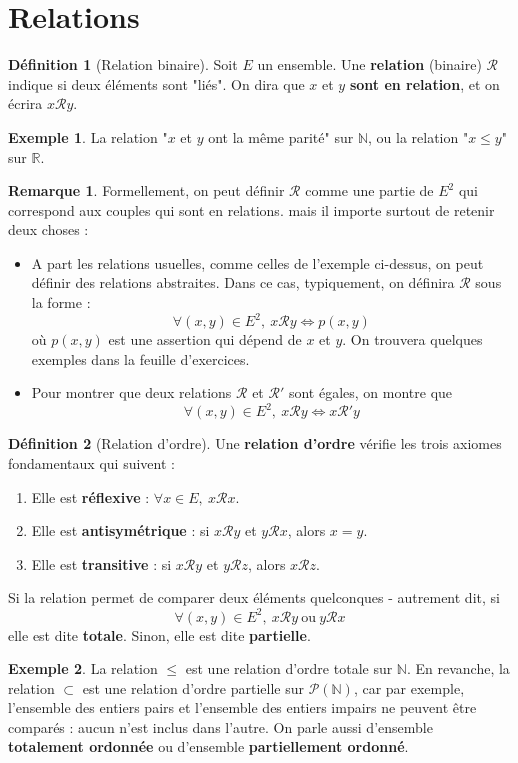 \documentclass[french]{book}
\newcommand{\N}{\mathbb{N}}
\newcommand{\R}{\mathbb{R}}
\theoremstyle{plain}
\theoremstyle{definition}
\newtheorem{dfn}{Définition}[chapter]
\newtheorem{exa}{Exemple}[chapter]
\newtheorem{rmq}{Remarque}[chapter]
\theoremstyle{remark}
\begin{document}
\section{Relations}
\begin{dfn}[Relation binaire]
	Soit $E$ un ensemble. Une \textbf{relation} (binaire) $\mathcal{R}$ indique si deux éléments sont "liés". On dira que $x$ et $y$ \textbf{sont en relation}, et on écrira $x\mathcal{R}y$.
\end{dfn}
\begin{exa}
	La relation "$x$ et $y$ ont la même parité" sur $\N$, ou la relation "$x\leqslant y$" sur $\R$.
\end{exa}
\begin{rmq}
	Formellement, on peut définir $\mathcal{R}$ comme une partie de $E^2$ qui correspond aux couples qui sont en relations. mais il importe surtout de retenir deux choses :
	\begin{itemize}
		\item A part les relations usuelles, comme celles de l'exemple ci-dessus, on peut définir des relations abstraites. Dans ce cas, typiquement, on définira $\mathcal{R}$ sous la forme :$$\forall(x,y)\in E^2,\ x\mathcal{R}y \iff p(x,y)$$ où $p(x,y)$ est une assertion qui dépend de $x$ et $y$. On trouvera quelques exemples dans la feuille d'exercices.
		\item Pour montrer que deux relations $\mathcal{R}$ et $\mathcal{R}'$ sont égales, on montre que $$\forall(x,y)\in E^2,\ x\mathcal{R}y \iff x\mathcal{R}'y$$ 
	\end{itemize}
\end{rmq}
\begin{dfn}[Relation d'ordre]
	Une \textbf{relation d'ordre} vérifie les trois axiomes fondamentaux qui suivent :
	\begin{enumerate}
		\item Elle est \textbf{réflexive} : $\forall x\in E,\ x\mathcal{R}x$.
		\item Elle est \textbf{antisymétrique} : si $x\mathcal{R}y$ et $y\mathcal{R}x$, alors $x=y$.
		\item Elle est \textbf{transitive} : si $x\mathcal{R}y$ et $y\mathcal{R}z$, alors $x\mathcal{R}z$.
	\end{enumerate}
	Si la relation permet de  comparer deux éléments quelconques - autrement dit, si $$\forall (x,y)\in E^2,\ x\mathcal{R}y \ \text{ou} \ y\mathcal{R}x$$ elle est dite \textbf{totale}. Sinon, elle est dite \textbf{partielle}.
\end{dfn}
\begin{exa}
	La relation $\leqslant$ est une relation d'ordre totale sur $\N$. En revanche, la relation $\subset$ est une relation d'ordre partielle sur $\mathcal{P}(\N)$, car par exemple, l'ensemble des entiers pairs et l'ensemble des entiers impairs ne peuvent être comparés : aucun n'est inclus dans l'autre. On parle aussi d'ensemble \textbf{totalement ordonnée} ou d'ensemble \textbf{partiellement ordonné}.
\end{exa}
\end{document}
